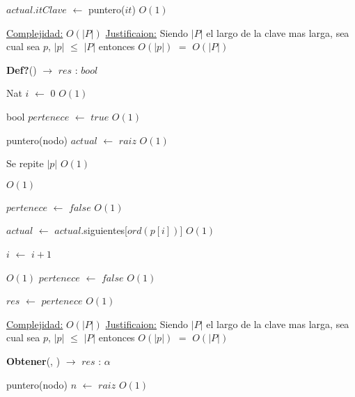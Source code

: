 \begin{Algoritmos}
\begin{algorithm}[H]
\begin{algorithmic}[1]
	\State $actual$.$itClave$ $\gets$ puntero($it$) \Comment $O(1)$
\EndIf

\medskip
\State \underline{Complejidad:} $O(|P|)$
\State \underline{Justificaion:} Siendo $|P|$ el largo de la clave mas larga, sea cual sea $p$, $|p|$ $\leq$ $|P|$ entonces 	$O(|p|)$ $=$ $O(|P|)$


\end{algorithmic}
\end{algorithm}  
  
  
\begin{algorithm}[H]
{\textbf{Def?}() $\to$ $res$ : $bool$}
\begin{algorithmic}[1]

\State Nat $i$ $\gets$ $0$ \Comment $O(1)$

\State bool $pertenece$ $\gets$ $true$ \Comment $O(1)$

\State puntero(nodo) $actual$ $\gets$ $raiz$ \Comment $O(1)$ 

   \Comment Se repite $|p|$ $O(1)$
		
	
	 \Comment $O(1)$

		\State $pertenece$ $\gets$ $false$ \Comment $O(1)$	 
	
	\EndIf
	
	\State $actual$ $\gets$ $actual$.siguientes[$ord(p[i])$] \Comment $O(1)$

	\State $i$ $\gets$ $i + 1$
\EndWhile 

 \Comment $O(1)$ 
	\State $pertenece$ $\gets$ $false$ \Comment $O(1)$
\EndIf

\State $res$ $\gets$ $pertenece$ \Comment $O(1)$ 

\medskip
\State \underline{Complejidad:} $O(|P|)$
\State \underline{Justificaion:} Siendo $|P|$ el largo de la clave mas larga, sea cual sea $p$, $|p|$ $\leq$ $|P|$ entonces 	$O(|p|)$ $=$ $O(|P|)$

\end{algorithmic}
\end{algorithm}
  
\begin{algorithm}[H]
{\textbf{Obtener}(, }) $\to$ $res$ : $\alpha$
\begin{algorithmic}[1]

\State puntero(nodo) $n$ $\gets$ $raiz$ \Comment $O(1)$


\end{algorithmic}
\end{algorithm}
\end{Algoritmos}

